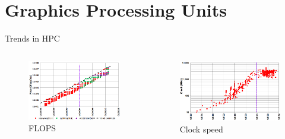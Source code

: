 \documentclass[10pt,times]{beamer}
\begin{document}
\section{Graphics Processing Units}
\begin{frame}{Trends in HPC}
\begin{columns}
\begin{figure}
\includegraphics[width=\linewidth]{figs/flops.png}
\caption*{FLOPS}
\end{figure}
\begin{figure}
\includegraphics[width=\linewidth]{figs/clocks.png}
\caption*{Clock speed}
\end{figure}
\end{columns}
\begin{columns}

\end{columns}
\end{frame}
\end{document}
